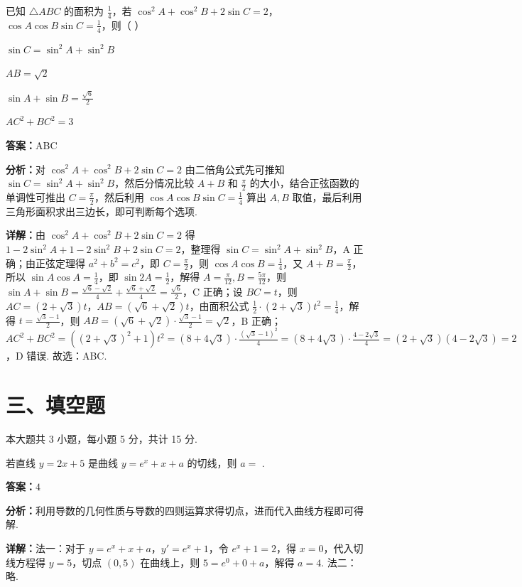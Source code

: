 \begin{question}[points=6]
已知 $\triangle ABC$ 的面积为 $\frac{1}{4}$，若 $\cos^2 A + \cos^2 B + 2\sin C = 2$，$\cos A \cos B \sin C = \frac{1}{4}$，则（ ）
\begin{choices}
  \item $\sin C = \sin^2 A + \sin^2 B$
  \item $AB = \sqrt{2}$
  \item $\sin A + \sin B = \frac{\sqrt{6}}{2}$
  \item $AC^2 + BC^2 = 3$
\end{choices}
\begin{solution}
\textbf{答案：}ABC

\textbf{分析：}对 $\cos^2 A + \cos^2 B + 2\sin C = 2$ 由二倍角公式先可推知 $\sin C = \sin^2 A + \sin^2 B$，然后分情况比较 $A+B$ 和 $\frac{\pi}{2}$ 的大小，结合正弦函数的单调性可推出 $C = \frac{\pi}{2}$，然后利用 $\cos A \cos B \sin C = \frac{1}{4}$ 算出 $A,B$ 取值，最后利用三角形面积求出三边长，即可判断每个选项.

\textbf{详解：}由 $\cos^2 A + \cos^2 B + 2\sin C = 2$ 得 $1-2\sin^2 A + 1-2\sin^2 B + 2\sin C = 2$，整理得 $\sin C = \sin^2 A + \sin^2 B$，A 正确；由正弦定理得 $a^2+b^2=c^2$，即 $C = \frac{\pi}{2}$，则 $\cos A \cos B = \frac{1}{4}$，又 $A+B=\frac{\pi}{2}$，所以 $\sin A \cos A = \frac{1}{4}$，即 $\sin 2A = \frac{1}{2}$，解得 $A = \frac{\pi}{12}, B = \frac{5\pi}{12}$，则 $\sin A + \sin B = \frac{\sqrt{6}-\sqrt{2}}{4} + \frac{\sqrt{6}+\sqrt{2}}{4} = \frac{\sqrt{6}}{2}$，C 正确；设 $BC = t$，则 $AC = (2+\sqrt{3})t$，$AB = (\sqrt{6}+\sqrt{2})t$，由面积公式 $\frac{1}{2} \cdot (2+\sqrt{3})t^2 = \frac{1}{4}$，解得 $t = \frac{\sqrt{3}-1}{2}$，则 $AB = (\sqrt{6}+\sqrt{2}) \cdot \frac{\sqrt{3}-1}{2} = \sqrt{2}$，B 正确；$AC^2+BC^2 = ((2+\sqrt{3})^2+1)t^2 = (8+4\sqrt{3}) \cdot \frac{(\sqrt{3}-1)^2}{4} = (8+4\sqrt{3}) \cdot \frac{4-2\sqrt{3}}{4} = (2+\sqrt{3})(4-2\sqrt{3}) = 2$，D 错误. 故选：ABC.
\end{solution}
\end{question}

\section*{三、填空题}
本大题共 3 小题，每小题 5 分，共计 15 分.

\begin{question}[points=5]
若直线 $y = 2x + 5$ 是曲线 $y = e^x + x + a$ 的切线，则 $a =$ .
\fillin[{$4$}]
\begin{solution}
\textbf{答案：}$4$

\textbf{分析：}利用导数的几何性质与导数的四则运算求得切点，进而代入曲线方程即可得解.

\textbf{详解：}法一：对于 $y = e^x + x + a$，$y' = e^x + 1$，令 $e^x+1=2$，得 $x=0$，代入切线方程得 $y=5$，切点 $(0,5)$ 在曲线上，则 $5 = e^0 + 0 + a$，解得 $a=4$. 法二：略.
\end{solution}
\end{question}

